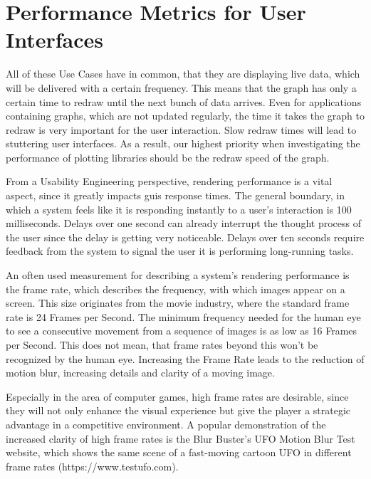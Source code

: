 \section{Performance Metrics for User Interfaces}
\label{sec:usecases:metrics}

All of these Use Cases have in common, that they are displaying live data, which
will be delivered with a certain frequency. This means that the graph has only a
certain time to redraw until the next bunch of data arrives. Even for
applications containing graphs, which are not updated regularly, the time it
takes the graph to redraw is very important for the user interaction. Slow
redraw times will lead to stuttering user interfaces. As a result, our highest
priority when investigating the performance of plotting libraries should be the
redraw speed of the graph.

From a Usability Engineering perspective, rendering performance is a vital
aspect, since it greatly impacts \glspl{gui} response times. The general
boundary, in which a system feels like it is responding instantly to a user's
interaction is 100 milliseconds. Delays over one second can already interrupt
the thought process of the user since the delay is getting very noticeable.
Delays over ten seconds require feedback from the system to
signal the user it is performing long-running tasks.
\cite{UsabilityEngineering}

An often used measurement for describing a system's rendering performance is the
frame rate, which describes the frequency, with which images appear on a screen.
This size originates from the movie industry, where the standard frame rate is 24
Frames per Second. The minimum frequency needed for the human eye to see a
consecutive movement from a sequence of images is as low as 16 Frames per
Second. This does not mean, that frame rates beyond this won't be recognized by
the human eye. Increasing the Frame Rate leads to the reduction of motion blur,
increasing details and clarity of a moving image.

Especially in the area of computer games, high frame rates are desirable, since
they will not only enhance the visual experience but give the player a
strategic advantage in a competitive environment.  A popular demonstration of
the increased clarity of high frame rates is the Blur Buster's UFO Motion Blur
Test website, which shows the same scene of a fast-moving cartoon UFO in different
frame rates (https://www.testufo.com).

